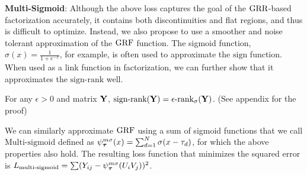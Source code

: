 \documentclass{article}
\newcommand{\para}[1]{\vspace{2mm}\noindent\textbf{#1}:}
\begin{document}
\para{Multi-Sigmoid}
Although the above loss captures the goal of the $\text{GRR}$-based factorization accurately, it contains both discontinuities and flat regions, and thus is difficult to optimize.
Instead, we also propose to use a smoother and noise tolerant approximation of the $\text{GRF}$ function.
The sigmoid function, $\sigma(x)=\frac{1}{1+e^{-x}}$, for example, is often used to approximate the $\text{sign}$ function.
When used as a link function in factorization, we can further show that it approximates the $\text{sign-rank}$ well. 
\begin{thm:thm}
For any $\epsilon>0$ and matrix $\mathbf{Y}$, $\text{sign-rank}(\mathbf{Y}) = \epsilon\text{-rank}_\sigma(\mathbf{Y})$. (See appendix for the proof)

\iffalse
\begin{proof}
By introducing $\Bm_\sigmoid^\epsilon(k)=\{\B\in\{0,1\}^{n\times m}; \apprank_\sigmoid(\B)=k\}$, i.e. the set of binary matrices whose $\apprank_\sigmoid$ is $k$, We prove the theorem by showing both directions.
$\Bm_\step\subseteq\Bm_\sigmoid$:
Any $\U,\V$ that works for $\step$ should work with $\sigmoid$ if multiplied by a very large number, i.e. take a sufficiently large $\eta$, and $\U_\sigmoid=\eta\U_\step,\V_\sigmoid=\eta\V_\step$.
Then, $\X_\sigmoid=\eta^2\X_\step$ and if we set $\lparams_\sigmoid=\eta^2\lparams_\step$, then $(\X_\sigmoid-\lparams_\sigmoid)=\eta^2(\X_\step-\lparams_\step)$, therefore will have the same sign, and $\Y_\sigmoid=\sigmoid(\X_\sigmoid)$ will be arbitrarily close to $0$ and $1$ in $\Y_\step$.

$\Bm_\sigmoid\subseteq\Bm_\step$:
Any $\U,\V$ that works for $\sigmoid$ will directly work with $\step$.
\end{proof}
\fi
\end{thm:thm}
We can similarly approximate $\text{GRF}$ using a sum of sigmoid functions that we call $\text{Multi-sigmoid}$ defined as $\psi^{m\sigma}_{{\boldsymbol{\tau}}}(x)=\sum_{d=1}^{N}\sigma(x-\tau_d)$, for which the above properties also hold.
The resulting loss function that minimizes the squared error is $L_{\text{multi-sigmoid}}=\sum(Y_{ij}-\psi^{m\sigma}_{\boldsymbol{\tau}}(U_iV_j))^2$.
\end{document}
